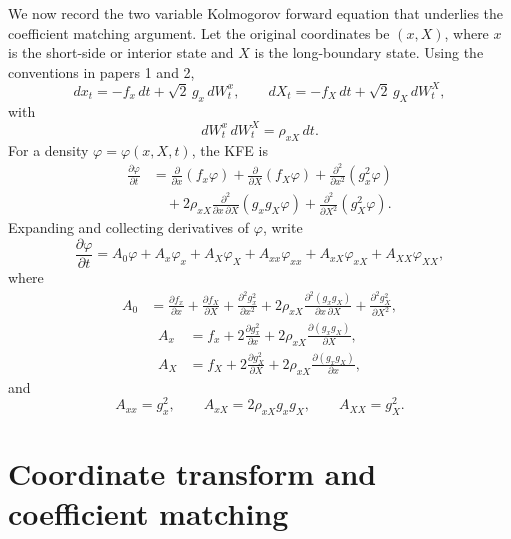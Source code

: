 \documentclass[11pt]{article}
\numberwithin{equation}{section}
\begin{document}
We now record the two variable Kolmogorov forward equation that underlies the coefficient matching argument. Let the original coordinates be \((x,X)\), where \(x\) is the short-side or interior state and \(X\) is the long-boundary state. Using the conventions in papers 1 and 2,
\begin{equation}
\label{eq:xX-sde}
dx_t=-f_x\,dt+\sqrt{2}\,g_x\,dW_t^x,
\qquad
dX_t=-f_X\,dt+\sqrt{2}\,g_X\,dW_t^X,
\end{equation}
with
\begin{equation}
\label{eq:xX-corr}
dW_t^x\,dW_t^X=\rho_{xX}\,dt.
\end{equation}
For a density \(\varphi=\varphi(x,X,t)\), the KFE is
\begin{align}
\label{eq:xX-KFE-conservative}
\frac{\partial\varphi}{\partial t}
&=
\frac{\partial}{\partial x}(f_x\varphi)
+
\frac{\partial}{\partial X}(f_X\varphi)
+
\frac{\partial^2}{\partial x^2}(g_x^2\varphi)
\nonumber\\
&\quad+
2\rho_{xX}\frac{\partial^2}{\partial x\,\partial X}(g_xg_X\varphi)
+
\frac{\partial^2}{\partial X^2}(g_X^2\varphi).
\end{align}
Expanding and collecting derivatives of \(\varphi\), write
\begin{equation}
\label{eq:xX-KFE-expanded}
\frac{\partial\varphi}{\partial t}
=
A_0\varphi+A_x\varphi_x+A_X\varphi_X+A_{xx}\varphi_{xx}+A_{xX}\varphi_{xX}+A_{XX}\varphi_{XX},
\end{equation}
where
\begin{align}
\label{eq:A0}
A_0
&=
\frac{\partial f_x}{\partial x}
+
\frac{\partial f_X}{\partial X}
+
\frac{\partial^2 g_x^2}{\partial x^2}
+
2\rho_{xX}\frac{\partial^2(g_xg_X)}{\partial x\,\partial X}
+
\frac{\partial^2 g_X^2}{\partial X^2},
\end{align}
\begin{align}
\label{eq:AxAX}
A_x
&=
f_x+2\frac{\partial g_x^2}{\partial x}
+2\rho_{xX}\frac{\partial(g_xg_X)}{\partial X},
\\
A_X
&=
f_X+2\frac{\partial g_X^2}{\partial X}
+2\rho_{xX}\frac{\partial(g_xg_X)}{\partial x},
\end{align}
and
\begin{equation}
\label{eq:A-second}
A_{xx}=g_x^2,
\qquad
A_{xX}=2\rho_{xX}g_xg_X,
\qquad
A_{XX}=g_X^2.
\end{equation}

\section{Coordinate transform and coefficient matching}
\end{document}
